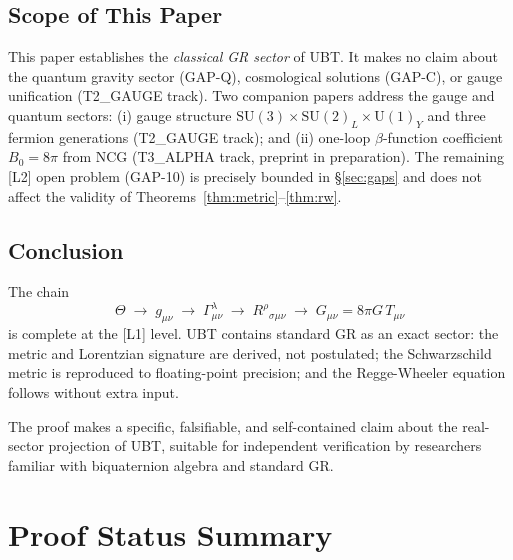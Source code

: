 \documentclass[12pt,a4paper]{article}
\theoremstyle{definition}
\theoremstyle{remark}
\begin{document}
\subsection{Scope of This Paper}

This paper establishes the \emph{classical GR sector} of UBT.
It makes no claim about the quantum gravity sector (GAP-Q),
cosmological solutions (GAP-C), or gauge unification (T2\_GAUGE track).
Two companion papers address the gauge and quantum sectors:
(i) gauge structure $\mathrm{SU}(3)\times\mathrm{SU}(2)_L\times\mathrm{U}(1)_Y$
and three fermion generations (T2\_GAUGE track); and
(ii) one-loop $\beta$-function coefficient $B_0=8\pi$ from NCG
(T3\_ALPHA track, preprint in preparation).
The remaining [L2] open problem (GAP-10) is precisely bounded in
\S\ref{sec:gaps} and does not affect the validity of Theorems~\ref{thm:metric}--\ref{thm:rw}.

\subsection{Conclusion}

The chain
\[
  \Theta \;\longrightarrow\;
  g_{\mu\nu} \;\longrightarrow\;
  \Gamma^\lambda_{\mu\nu} \;\longrightarrow\;
  R^\rho{}_{\sigma\mu\nu} \;\longrightarrow\;
  G_{\mu\nu} = 8\pi G\,T_{\mu\nu}
\]
is complete at the [L1] level.
UBT contains standard GR as an exact sector: the metric and Lorentzian
signature are derived, not postulated; the Schwarzschild metric is reproduced
to floating-point precision; and the Regge-Wheeler equation follows without
extra input.

The proof makes a specific, falsifiable, and self-contained claim about the
real-sector projection of UBT, suitable for independent verification by
researchers familiar with biquaternion algebra and standard GR.

\section{Proof Status Summary}
\label{sec:summary}
\end{document}
